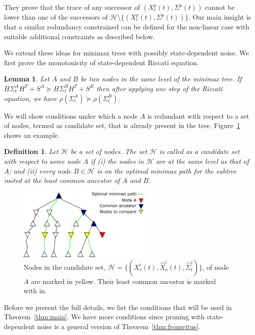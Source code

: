 \documentclass[journal]{IEEEtran}
\newtheorem{lemma}{Lemma}
\newtheorem{definition}{Definition}
\begin{document}
They prove that the trace of any successor of $(X^p_r(t),\Sigma^p(t))$ cannot be lower than one of the successors of $\mathcal{H}\setminus\{(X^p_r(t),\Sigma^p(t))\}$. Our main insight is that a similar redundancy constrained can be defined for the non-linear case with suitable additional constraints as described below.

We extend these ideas for minimax trees with possibly state-dependent noise. We first prove the monotonicity of state-dependent Riccati equation.
\begin{lemma}
Let $A$ and $B$ be two nodes in the same level of the minimax tree. If
$H\Sigma_{t}^AH^T+S^A \succeq H\Sigma_{t}^BH^T+ S^B$
 then after applying one step of the Riccati equation, we have $\rho(\Sigma_{t}^A)\succeq \rho(\Sigma_{t}^B)$. 
 \label{lemma:mono}
\end{lemma}
We will show conditions under which a node $A$ is redundant with respect to a set of nodes, termed as candidate set, that is already present in the tree. Figure~\ref{fig:candidate set} shows an example.
\begin{definition} 
Let $\mathcal{H}$ be a set of nodes. The set $\mathcal{H}$ is called as a \emph{candidate set} with respect to some node $A$ if (i) the nodes in $\mathcal{H}$ are at the same level as that of $A$; and (ii) every node $B\in\mathcal{H}$ is on the optimal minimax path for the subtree rooted at the least common ancestor of $A$ and $B$.
\end{definition}

\begin{figure}[h] 
  \centering
  \includegraphics[height=3.5cm  ]{figs/minimax_pruning.eps}
  \caption{Nodes in the candidate set, $\mathcal{H} = \{(X^i_r(t),\hat{X}^i_o(t),\hat{\Sigma}^i_t)\}$, of node $A$ are marked in yellow. Their least common ancestor is marked with in.}
  \label{fig:candidate set}
\end{figure}

Before we present the full details, we list the conditions that will be used in Theorem~\ref{thm:main}. We have more conditions since pruning with state-dependent noise is a general version of Theorem~\ref{thm:fromvitus}. 
\end{document}
